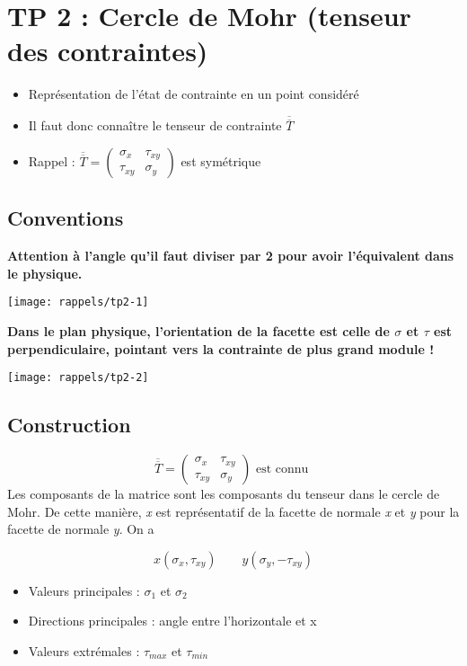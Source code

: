 
\section*{TP 2 : Cercle de Mohr (tenseur des contraintes)}
\begin{itemize}
	\item Représentation de l'état de contrainte en un point considéré
	\item Il faut donc connaître le tenseur de contrainte $\overline{\overline{T}}$
	\item Rappel : $\overline{\overline{T}} = 
	\left(	
	\begin{array}{cc}
	\sigma _x & \tau _{xy} \\ 
	\tau _{xy} & \sigma _y
	\end{array}
	\right) $ est symétrique
\end{itemize}

\subsection*{Conventions}
\noindent \textbf{Attention à l'angle qu'il faut diviser par 2 pour avoir l'équivalent dans le physique.}
\begin{center}
\texttt{[image: rappels/tp2-1]}
\end{center}

\textbf{Dans le plan physique, l'orientation de la facette est celle de $\sigma$ et $\tau$ est perpendiculaire, pointant vers la contrainte de plus grand module !}
\begin{center}
\texttt{[image: rappels/tp2-2]}
\end{center}

\subsection*{Construction}
\begin{equation}
\overline{\overline{T}} = 
	\left(	
	\begin{array}{cc}
	\sigma _x & \tau _{xy} \\ 
	\tau _{xy} & \sigma _y
	\end{array}
	\right) \mbox{ est connu }
\end{equation}
Les composants de la matrice sont les composants du tenseur dans le cercle de Mohr. De cette manière, \textit{x} est représentatif de la facette de normale \textit{x} et \textit{y} pour la facette de normale \textit{y}. On a

\begin{equation}
x(\sigma _x , \tau _{xy}) \qquad y(\sigma _y, - \tau _{xy})
\end{equation}

\begin{itemize}
	\item Valeurs principales : $\sigma _1$ et $\sigma _2$
	\item Directions principales : angle entre l'horizontale et x
	\item Valeurs extrémales : $\tau _{max}$ et $\tau _{min}$
\end{itemize}